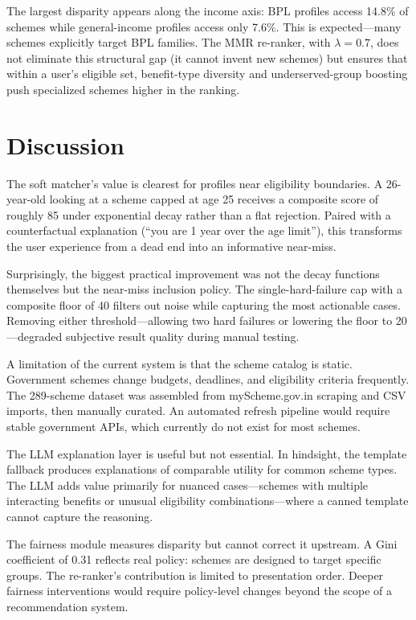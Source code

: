 \documentclass[conference]{IEEEtran}
\begin{document}
The largest disparity appears along the income axis: BPL profiles access 14.8\% of schemes while general-income profiles access only 7.6\%. This is expected---many schemes explicitly target BPL families. The MMR re-ranker, with $\lambda = 0.7$, does not eliminate this structural gap (it cannot invent new schemes) but ensures that within a user's eligible set, benefit-type diversity and underserved-group boosting push specialized schemes higher in the ranking.

\section{Discussion}

The soft matcher's value is clearest for profiles near eligibility boundaries. A 26-year-old looking at a scheme capped at age 25 receives a composite score of roughly 85 under exponential decay rather than a flat rejection. Paired with a counterfactual explanation (``you are 1 year over the age limit''), this transforms the user experience from a dead end into an informative near-miss.

Surprisingly, the biggest practical improvement was not the decay functions themselves but the near-miss inclusion policy. The single-hard-failure cap with a composite floor of 40 filters out noise while capturing the most actionable cases. Removing either threshold---allowing two hard failures or lowering the floor to 20---degraded subjective result quality during manual testing.

A limitation of the current system is that the scheme catalog is static. Government schemes change budgets, deadlines, and eligibility criteria frequently. The 289-scheme dataset was assembled from myScheme.gov.in scraping and CSV imports, then manually curated. An automated refresh pipeline would require stable government APIs, which currently do not exist for most schemes.

The LLM explanation layer is useful but not essential. In hindsight, the template fallback produces explanations of comparable utility for common scheme types. The LLM adds value primarily for nuanced cases---schemes with multiple interacting benefits or unusual eligibility combinations---where a canned template cannot capture the reasoning.

The fairness module measures disparity but cannot correct it upstream. A Gini coefficient of 0.31 reflects real policy: schemes are designed to target specific groups. The re-ranker's contribution is limited to presentation order. Deeper fairness interventions would require policy-level changes beyond the scope of a recommendation system.
\end{document}
